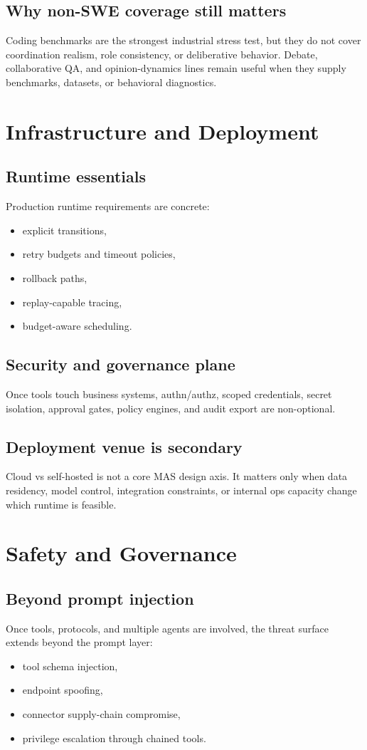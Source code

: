 \documentclass[11pt]{article}
\begin{document}
\subsection{Why non-SWE coverage still matters}
Coding benchmarks are the strongest industrial stress test, but they do not cover coordination realism, role consistency, or deliberative behavior. Debate, collaborative QA, and opinion-dynamics lines remain useful when they supply benchmarks, datasets, or behavioral diagnostics.

\section{Infrastructure and Deployment}
\subsection{Runtime essentials}
Production runtime requirements are concrete:
\begin{itemize}[leftmargin=1.2em]
  \item explicit transitions,
  \item retry budgets and timeout policies,
  \item rollback paths,
  \item replay-capable tracing,
  \item budget-aware scheduling.
\end{itemize}

\subsection{Security and governance plane}
Once tools touch business systems, authn/authz, scoped credentials, secret isolation, approval gates, policy engines, and audit export are non-optional.

\subsection{Deployment venue is secondary}
Cloud vs self-hosted is not a core MAS design axis. It matters only when data residency, model control, integration constraints, or internal ops capacity change which runtime is feasible.

\section{Safety and Governance}
\subsection{Beyond prompt injection}
Once tools, protocols, and multiple agents are involved, the threat surface extends beyond the prompt layer:
\begin{itemize}[leftmargin=1.2em]
  \item tool schema injection,
  \item endpoint spoofing,
  \item connector supply-chain compromise,
  \item privilege escalation through chained tools.
\end{itemize}
\end{document}
